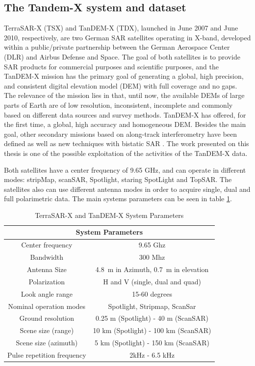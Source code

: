 \subsection{The Tandem-X system and dataset}
TerraSAR-X (TSX) and TanDEM-X (TDX), launched in June 2007 and June 2010,
respectively, are two German SAR satellites operating in X-band, developed within a
public/private partnership between the German Aerospace Center (DLR) and Airbus
Defense and Space.
The goal of both satellites is to provide SAR products for commercial purposes and
scientific purposes, and the TanDEM-X mission has the primary goal of generating a global,
high precision, and consistent digital elevation model (DEM) with full coverage and no
gaps. The relevance of the mission lies in that, until now, the available DEMs of large
parts of Earth are of low resolution, inconsistent, incomplete and commonly based on
different data sources and survey methods.
TanDEM-X has offered, for the first time, a global, high accuracy and homogeneous DEM.
Besides the main goal, other secondary missions based on along-track interferometry have
been defined as well as new techniques with bistatic SAR \cite{Alberto}. The work presented on this thesis is one of the
possible exploitation of the activities of the TanDEM-X data.

Both satellites have a center frequency of 9.65 GHz, and can operate in different modes: stripMap, scanSAR, Spotlight, staring SpotLight and TopSAR. The satellites also can use different antenna modes in order to acquire single, dual and full polarimetric data. The main systems parameters can be seen in table \ref{tab:tandem_params}.

\begin{table}[H]
    \centering
    \begin{tabular}{|c|c|}
        \hline 
        \multicolumn{2}{|c|}{System Parameters} \\ 
        \hline \hline
        Center frequency & 9.65 Ghz  \\ \hline
        Bandwidth & 300 Mhz  \\ \hline
        Antenna Size & 4.8 m in Azimuth, 0.7 m in elevation  \\ \hline
        Polarization & H and V (single, dual and quad)  \\ \hline
        Look angle range & 15-60 degrees  \\ \hline
        Nominal operation modes & Spotlight, Stripmap, ScanSar  \\ \hline
        Ground resolution & 0.25 m (Spotlight) - 40 m (ScanSAR) \\ \hline
        Scene size (range) & 10 km (Spotlight) - 100 km (ScanSAR)  \\ \hline
        Scene size (azimuth) & 5 km (Spotlight) - 150 km (ScanSAR)  \\ \hline
        Pulse repetition frequency & 2kHz - 6.5 kHz \\ \hline
    \end{tabular}
    \caption{TerraSAR-X and TanDEM-X System Parameters}
    \label{tab:tandem_params}
\end{table}


